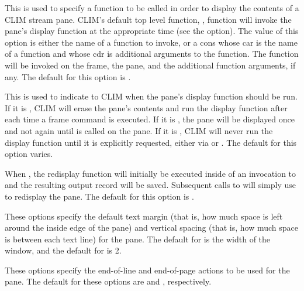 
This is used to specify a function to be called in order to display the contents
of a CLIM stream pane.  CLIM's default top level function,
, function will invoke the pane's display function
at the appropriate time (see the  option).  The value of this
option is either the name of a function to invoke, or a cons whose car is the
name of a function and whose cdr is additional arguments to the function.  The
function will be invoked on the frame, the pane, and the additional function
arguments, if any.  The default for this option is .


This is used to indicate to CLIM when the pane's display function should be run.
If it is , CLIM will erase the pane's contents and run the
display function after each time a frame command is executed.  If it is ,
the pane will be displayed once and not again until  is
called on the pane.  If it is , CLIM will never run the display function
until it is explicitly requested, either via  or
.  The default for this option varies.


When , the redisplay function will initially be executed inside of an
invocation to  and the resulting output record will be
saved.  Subsequent calls to  will simply use
 to redisplay the pane.  The default for this option is .


These options specify the default text margin (that is, how much space is left
around the inside edge of the pane) and vertical spacing (that is, how much space
is between each text line) for the pane.  The default for  is
the width of the window, and the default for  is 2.



These options specify the end-of-line and end-of-page actions to be used for the
pane.  The default for these options are  and ,
respectively.


